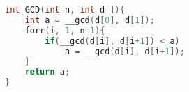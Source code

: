 \begin{lstlisting}[language=C++]
int GCD(int n, int d[]){
	int a = __gcd(d[0], d[1]);
	forr(i, 1, n-1){
		if(__gcd(d[i], d[i+1]) < a)
			a = __gcd(d[i], d[i+1]);
	}
	return a;
}
\end{lstlisting}